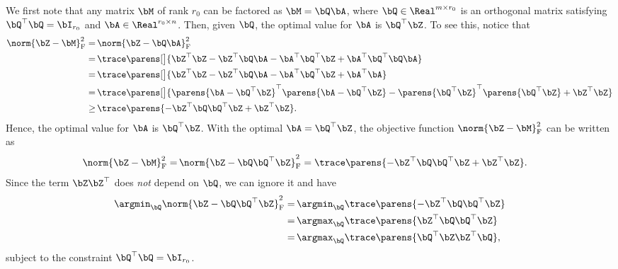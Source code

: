 \documentclass[12pt]{article}
\begin{document}
\begin{enumerate}[label=\textbf{\arabic*.}]
	We first note that any matrix $\bM$ of rank $r_0$ can be factored as $\bM = \bQ \bA$, where $\bQ \in \Real^{m \times r_0}$ is an orthogonal matrix satisfying $\bQ^\top \bQ = \bI_{r_0}$ and $\bA \in \Real^{r_0 \times n}$. Then, given $\bQ$, the optimal value for $\bA$ is $\bQ^\top \bZ$. To see this, notice that 
	\begin{align*}
		\norm{\bZ - \bM}_{\mathrm{F}}^2 = & \, \norm{\bZ - \bQ \bA}_{\mathrm{F}}^2 \\ 
		= & \, \trace \parens[\big]{\bZ^\top \bZ - \bZ^\top \bQ \bA - \bA^\top \bQ^\top \bZ + \bA^\top \bQ^\top \bQ \bA} \\ 
		= & \, \trace \parens[\big]{\bZ^\top \bZ - \bZ^\top \bQ \bA - \bA^\top \bQ^\top \bZ + \bA^\top \bA} \\ 
		= & \, \trace \parens[\big]{ \parens{\bA - \bQ^\top \bZ}^\top \parens{\bA - \bQ^\top \bZ} - \parens{\bQ^\top \bZ}^\top \parens{\bQ^\top \bZ} + \bZ^\top \bZ} \\ 
		\ge & \, \trace \parens{ - \bZ^\top \bQ \bQ^\top \bZ + \bZ^\top \bZ}. 
	\end{align*}
	Hence, the optimal value for $\bA$ is $\bQ^\top \bZ$. With the optimal $\bA = \bQ^\top \bZ$, the objective function $\norm{\bZ - \bM}_{\mathrm{F}}^2$ can be written as 
	\begin{align*}
		\norm{\bZ - \bM}_{\mathrm{F}}^2 = & \, \norm{\bZ - \bQ \bQ^\top \bZ}_{\mathrm{F}}^2 
		= \trace \parens{- \bZ^\top \bQ \bQ^\top \bZ + \bZ^\top \bZ}. 
	\end{align*}
	Since the term $\bZ \bZ^\top$ does \emph{not} depend on $\bQ$, we can ignore it and have 
	\begin{align*}
		\argmin_{\bQ} \norm{\bZ - \bQ \bQ^\top \bZ}_{\mathrm{F}}^2 = & \, \argmin_{\bQ} \trace \parens{- \bZ^\top \bQ \bQ^\top \bZ} \\ 
		= & \, \argmax_{\bQ} \trace \parens{\bZ^\top \bQ \bQ^\top \bZ} \\ 
		= & \, \argmax_{\bQ} \trace \parens{\bQ^\top \bZ \bZ^\top \bQ}, 
	\end{align*}
	subject to the constraint $\bQ^\top \bQ = \bI_{r_0}$. 
	

\end{enumerate}
\end{document}
